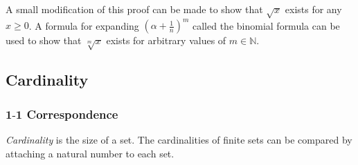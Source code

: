 \documentclass{article}
\begin{document}
        A small modification of this proof can be made to show that $\sqrt{x}$ exists for any $x \geq 0$. A formula for expanding $(\alpha + \frac{1}{n})^m$ called the binomial formula can be used to show that $\sqrt[m]{x}$ exists for arbitrary values of $m \in \mathbb{N}$.
    
    \subsection{Cardinality}
    \subsubsection{$\textbf{1-1}$ Correspondence}
        \textit{Cardinality} is the size of a set. The cardinalities of finite sets can be compared by attaching a natural number to each set.
        \\ \\
        \\
        
\end{document}
